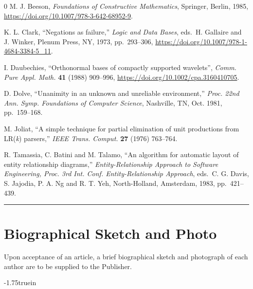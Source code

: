 \documentclass{ws-ijprai}
\begin{document}
\begin{thebibliography}{0}
 M. J. Beeson, {\it Foundations of Constructive
Mathematics}, Springer, Berlin, 1985, \url{https://doi.org/10.1007/978-3-642-68952-9}.

 K. L. Clark, ``Negations as failure,''
{\it Logic and Data Bases}, eds.~H. Gallaire and\break
J. Winker, Plenum Press, NY, 1973, pp.~293--306, \url{https://doi.org/10.1007/978-1-4684-3384-5_11}.

 I. Daubechies, ``Orthonormal bases of compactly supported wavelets'', {\it Comm. Pure Appl. Math.} {\bf 41} (1988) 909--996, \url{https://doi.org/10.1002/cpa.3160410705}.

 D. Dolve, ``Unanimity in an unknown and unreliable
environment,'' {\it Proc. 22nd Ann. Symp. Foundations of
Computer Science}, Nashville, TN, Oct. 1981, pp.~159--168.

 M. Joliat, ``A simple technique for partial elimination of unit productions from LR({\it k}) parsers,'' {\it IEEE Trans. Comput.} {\bf 27} (1976) 763--764.

 R. Tamassia, C. Batini and M. Talamo,
``An algorithm for automatic layout of entity relationship diagrams,''
{\it Entity-Relationship Approach to Software Engineering,
Proc. 3rd Int. Conf. Entity-Relationship Approach}, eds.~C. G. Davis, S. Jajodia, P. A. Ng and R. T. Yeh, North-Holland, Amsterdam, 1983,
pp.~421--439.
\end{thebibliography}

\vspace*{-0.1in}
\noindent
\rule{12.6cm}{.1mm}

\section*{Biographical Sketch and Photo}

Upon acceptance of an article, a brief biographical sketch and
photograph of each author are to be supplied to the Publisher.


\vglue-1.75truein
\hspace*{2.45truein}
\end{document}
